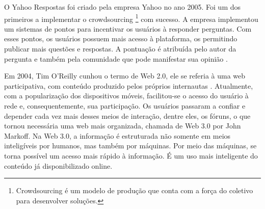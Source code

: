 O Yahoo Respostas foi criado pela empresa Yahoo no ano 2005. Foi um dos primeiros a implementar o crowdsourcing \footnote{Crowdsourcing é um modelo de produção que conta com a força do coletivo para desenvolver soluções.} com sucesso. A empresa implementou um sistemas de pontos para incentivar os usuários à responder perguntas. Com esses pontos, os usuários possuem mais acesso à plataforma, os permitindo publicar mais questões e respostas. A pontuação é atribuída pelo autor da pergunta e também pela comunidade que pode manifestar sua opinião \cite{yahooanswerswiki}.

Em 2004, Tim O'Reilly cunhou o termo de Web 2.0, ele se referia à uma web participativa, com conteúdo produzido pelos próprios internautas \cite{webtransition}. Atualmente, com a popularização dos dispositivos móveis, facilitou-se o acesso do usuário à rede e, consequentemente, sua participação. Os usuários passaram a confiar e depender cada vez mais desses meios de interação, dentre eles, os fóruns, o que tornou necessária uma web mais organizada, chamada de Web 3.0 por John Markoff. Na Web 3.0, a informação é estruturada não somente em meios inteligíveis por humanos, mas também por máquinas. Por meio das máquinas, se torna possível um acesso mais rápido à informação. É um uso mais inteligente do conteúdo já disponibilizado online.
